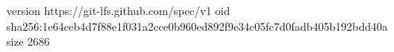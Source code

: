 version https://git-lfs.github.com/spec/v1
oid sha256:1e64ceb4d7f88e1f031a2cce0b960ed892f9e34c05fc7d0fadb405b192bdd40a
size 2686
